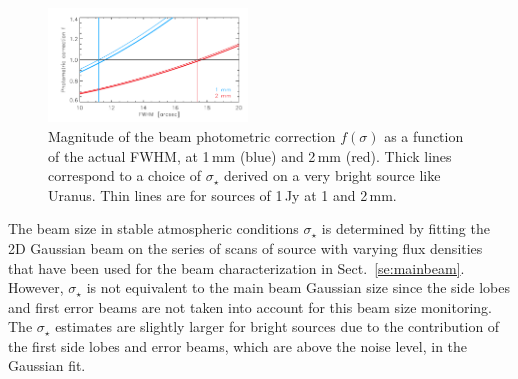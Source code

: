 \begin{figure}[ht!]
  \begin{center}
    \includegraphics[clip=true, trim={0.9cm, 0.1cm, 0.5cm, 0.5cm}, width=0.4725\textwidth]{Figures/photometric_correction_function_1Jy.pdf}
    \caption[Photometric correction]{Magnitude of the beam photometric
      correction $f(\sigma)$ as a function of the actual FWHM, at 1\,mm (blue)
      and 2\,mm (red). Thick lines correspond to a choice of $\sigma_\star$
      derived on a very bright source like Uranus. Thin lines are for sources of
      1\,Jy at 1 and 2\,mm.}
\label{fig:f_sigma}
\end{center}
\end{figure}



The beam size in stable atmospheric conditions $\sigma_\star$ is
determined by fitting the 2D Gaussian beam on the series of scans of
source with varying flux densities that have been used for the beam
characterization in Sect.~\ref{se:mainbeam}. However, $\sigma_\star$
is not equivalent to the main beam Gaussian size since the side lobes
and first error beams are not taken into account for this beam size
monitoring. The $\sigma_\star$ estimates are slightly
larger for bright sources due to the contribution of the first side
lobes and error beams, which are above the noise level, in the Gaussian fit.

